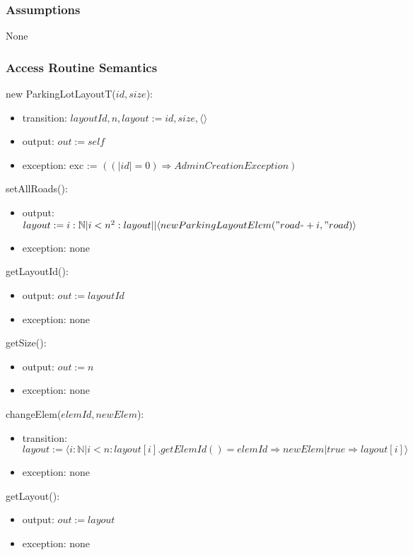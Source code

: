 \documentclass[12pt, titlepage]{article}
\begin{document}
\subsubsection{Assumptions}
None

\subsubsection{Access Routine Semantics}

\noindent new ParkingLotLayoutT($id, size$):
\begin{itemize}
\item transition: $layoutId, n, layout :=  id, size, \langle \rangle$
\item output: $out := self$
\item exception: exc := $((|id| = 0) \Rightarrow AdminCreationException)$
\end{itemize}

\noindent setAllRoads():
\begin{itemize} 
\item output: $layout := i:\mathbb{N} | i < n^2 : layout || \langle new
ParkingLayoutElem("road_" + i, "road) \rangle $
\item exception: none
\end{itemize}

\noindent getLayoutId():
\begin{itemize} 
\item output: $out := layoutId$
\item exception: none
\end{itemize}

\noindent getSize():
\begin{itemize} 
\item output: $out := n$
\item exception: none
\end{itemize}

\noindent changeElem($elemId, newElem$):
\begin{itemize} 
\item transition: $layout := \langle i:\mathbb{N} | i < n :
layout[i].getElemId() = elemId \Rightarrow newElem | true \Rightarrow layout[i]
\rangle$
\item exception: none
\end{itemize}

\noindent getLayout():
\begin{itemize} 
\item output: $out := layout$
\item exception: none
\end{itemize}
\end{document}
